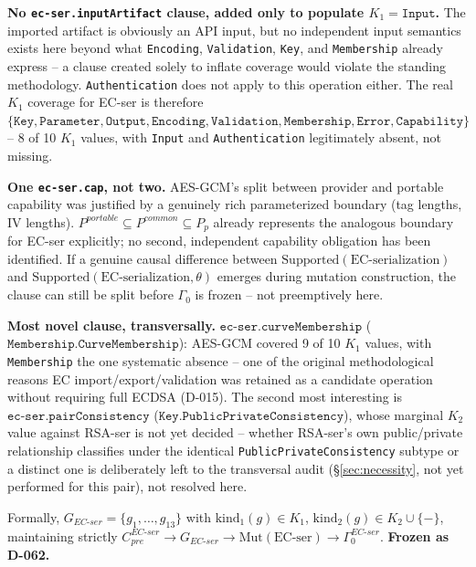 \documentclass[11pt,a4paper]{article}
\begin{document}
\textbf{No \texttt{ec-ser.inputArtifact} clause, added only to populate $K_1=\texttt{Input}$.} The imported artifact is obviously an API input, but no independent input semantics exists here beyond what \texttt{Encoding}, \texttt{Validation}, \texttt{Key}, and \texttt{Membership} already express -- a clause created solely to inflate coverage would violate the standing methodology. \texttt{Authentication} does not apply to this operation either. The real $K_1$ coverage for EC-ser is therefore $\{\texttt{Key}, \texttt{Parameter}, \texttt{Output}, \texttt{Encoding}, \texttt{Validation}, \texttt{Membership}, \texttt{Error}, \texttt{Capability}\}$ -- 8 of 10 $K_1$ values, with \texttt{Input} and \texttt{Authentication} legitimately absent, not missing.

\textbf{One \texttt{ec-ser.cap}, not two.} AES-GCM's split between provider and portable capability was justified by a genuinely rich parameterized boundary (tag lengths, IV lengths). $P^{portable}\subseteq P^{common}\subseteq P_p$ already represents the analogous boundary for EC-ser explicitly; no second, independent capability obligation has been identified. If a genuine causal difference between $\text{Supported}(\text{EC-serialization})$ and $\text{Supported}(\text{EC-serialization},\theta)$ emerges during mutation construction, the clause can still be split before $\Gamma_0$ is frozen -- not preemptively here.

\textbf{Most novel clause, transversally.} $\texttt{ec-ser.curveMembership}$ ($\texttt{Membership.CurveMembership}$): AES-GCM covered 9 of 10 $K_1$ values, with \texttt{Membership} the one systematic absence -- one of the original methodological reasons EC import/export/validation was retained as a candidate operation without requiring full ECDSA (D-015). The second most interesting is $\texttt{ec-ser.pairConsistency}$ ($\texttt{Key.PublicPrivateConsistency}$), whose marginal $K_2$ value against RSA-ser is not yet decided -- whether RSA-ser's own public/private relationship classifies under the identical \texttt{PublicPrivateConsistency} subtype or a distinct one is deliberately left to the transversal audit (\S\ref{sec:necessity}, not yet performed for this pair), not resolved here.

Formally, $G_{EC\text{-}ser}=\{g_1,\ldots,g_{13}\}$ with $\text{kind}_1(g)\in K_1$, $\text{kind}_2(g)\in K_2\cup\{-\}$, maintaining strictly $C_{pre}^{EC\text{-}ser} \to G_{EC\text{-}ser} \to \text{Mut}(\text{EC-ser}) \to \Gamma_0^{EC\text{-}ser}$. \textbf{Frozen as D-062.}
\end{document}
